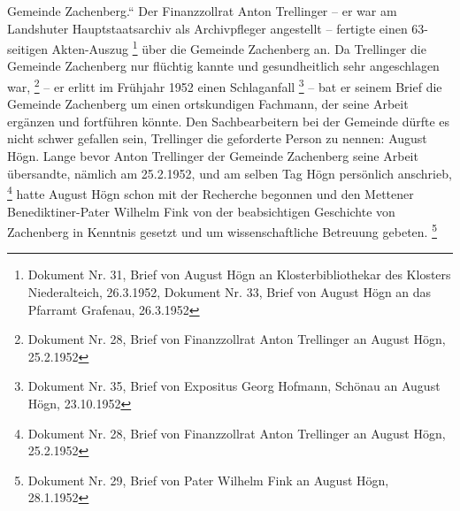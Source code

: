 Gemeinde Zachenberg.“ Der Finanzzollrat Anton Trellinger – er war am
Landshuter Hauptstaatsarchiv als Archivpfleger angestellt – fertigte
einen 63-seitigen Akten-Auszug \footnote{Dokument Nr. 31, Brief von
August Högn an Klosterbibliothekar des Klosters Niederalteich,
26.3.1952, Dokument Nr. 33, Brief von August Högn an das Pfarramt
Grafenau, 26.3.1952} über die Gemeinde Zachenberg an. Da Trellinger die
Gemeinde Zachenberg nur flüchtig kannte und gesundheitlich sehr
angeschlagen war, \footnote{Dokument Nr. 28, Brief von Finanzzollrat
Anton Trellinger an August Högn, 25.2.1952} – er erlitt im Frühjahr
1952 einen Schlaganfall \footnote{Dokument Nr. 35, Brief von Expositus
Georg Hofmann, Schönau an August Högn, 23.10.1952} – bat er seinem
Brief die Gemeinde Zachenberg um einen ortskundigen Fachmann, der seine
Arbeit ergänzen und fortführen könnte. Den Sachbearbeitern bei der
Gemeinde dürfte es nicht schwer gefallen sein, Trellinger die
geforderte Person zu nennen: August Högn. Lange bevor Anton Trellinger
der Gemeinde Zachenberg seine Arbeit übersandte, nämlich am 25.2.1952,
und am selben Tag Högn persönlich anschrieb, \footnote{Dokument Nr. 28,
Brief von Finanzzollrat Anton Trellinger an August Högn, 25.2.1952}
hatte August Högn schon mit der Recherche begonnen und den Mettener
Benediktiner-Pater Wilhelm Fink von der beabsichtigen Geschichte von
Zachenberg in Kenntnis gesetzt und um wissenschaftliche Betreuung
gebeten. \footnote{Dokument Nr. 29, Brief von Pater Wilhelm Fink an
August Högn, 28.1.1952}

